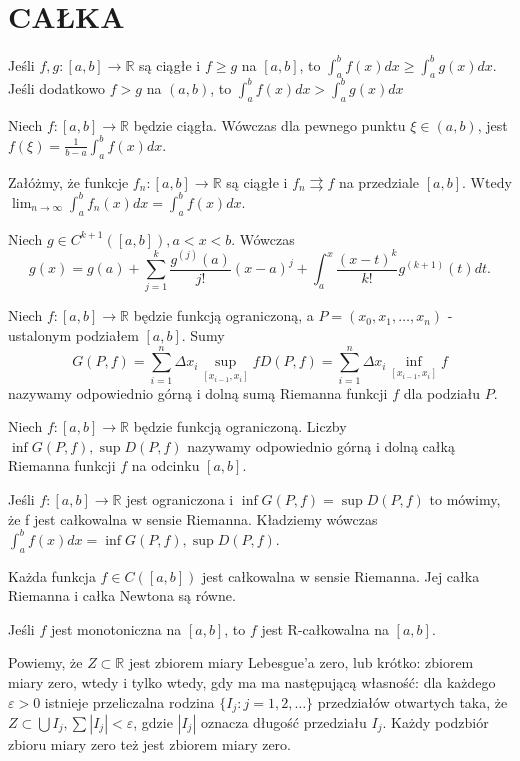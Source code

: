 \documentclass[12pt]{article}
\newcommand{\R}{\mathbb{R}}
\newcommand{\limn}{\lim_{n \rightarrow \infty}}
\begin{document}
\section*{CAŁKA}

Jeśli $f, g : [a, b] \rightarrow \R$ są ciągłe i $f \geq g$ na $[a, b]$, to
$\int_a^b f(x) dx \geq \int_a^b g(x) dx$.
Jeśli dodatkowo $f > g$ na $(a, b)$, to
$\int_a^b f(x) dx > \int_a^b g(x) dx$

Niech $f : [a, b] \rightarrow \R$ będzie ciągła. Wówczas dla pewnego punktu $\xi \in (a, b)$, jest
$f(\xi) = \frac{1}{b - a} \int_a^b f(x) dx$.

Załóżmy, że funkcje $f_n : [a, b] \rightarrow \R$ są ciągłe i $f_n \rightrightarrows f$ na przedziale $[a, b]$. Wtedy $\limn \int_a^b f_n(x) dx = \int_a^b f(x) dx$.

Niech $g \in C^{k+1}([a, b]), a < x < b$. Wówczas
$$g(x) = g(a) + \sum_{j=1}^k \frac{g^{(j)}(a)}{j!} (x-a)^j + \int_a^x \frac{(x- t)^k}{k!} g^{(k + 1)}(t) dt .$$

Niech $f : [a, b] \rightarrow \R$ będzie funkcją ograniczoną, a $P = (x_0, x_1, \ldots, x_n)$ - ustalonym podziałem $[a, b]$. Sumy
$$G(P, f) = \sum_{i=1}^n \Delta x_i \sup_{[x_{i-1},x_i]} f
D(P, f) = \sum_{i=1}^n \Delta x_i \inf_{[x_{i-1},x_i]} f $$
nazywamy odpowiednio górną i dolną sumą Riemanna funkcji $f$ dla podziału $P$.

Niech $f : [a, b] \rightarrow \R$ będzie funkcją ograniczoną. Liczby
$\inf G(P, f), \sup D(P, f)$
nazywamy odpowiednio górną i dolną całką Riemanna funkcji $f$ na odcinku $[a, b]$.

Jeśli $f : [a, b] \rightarrow \R$ jest ograniczona i
$\inf G(P, f) = \sup D(P, f)$
to mówimy, że f jest całkowalna w sensie Riemanna. Kładziemy wówczas
$\int_a^b f(x) dx = \inf G(P, f), \sup D(P, f)$.

\theorem{}
Każda funkcja $f \in C([a, b])$ jest całkowalna w sensie Riemanna. Jej
całka Riemanna i całka Newtona są równe.

\theorem{}
Jeśli $f$ jest monotoniczna na $[a, b]$, to $f$ jest R-całkowalna na $[a, b]$.

Powiemy, że $Z \subset \R$ jest zbiorem miary Lebesgue’a zero, lub krótko: zbiorem miary zero, wtedy i tylko wtedy, gdy ma ma następującą własność: dla każdego $\varepsilon > 0$
istnieje przeliczalna rodzina $\{I_j : j = 1, 2, \ldots \}$ przedziałów otwartych taka, że
$Z \subset \bigcup I_j, \sum
|I_j| < \varepsilon$,
gdzie $|I_j|$ oznacza długość przedziału $I_j$.
Każdy podzbiór zbioru miary zero też jest zbiorem miary zero.
\end{document}
